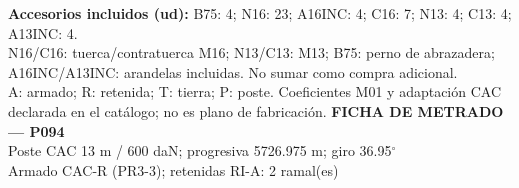 \begingroup\scriptsize
\textbf{Accesorios incluidos (ud):} B75: 4; N16: 23; A16INC: 4; C16: 7; N13: 4; C13: 4; A13INC: 4.\\
N16/C16: tuerca/contratuerca M16; N13/C13: M13; B75: perno de abrazadera; A16INC/A13INC: arandelas incluidas. No sumar como compra adicional.\\
A: armado; R: retenida; T: tierra; P: poste. Coeficientes M01 y adaptación CAC declarada en el catálogo; no es plano de fabricación.
\endgroup\endgroup
\clearpage{}
\begingroup\small\setlength{\parskip}{3pt}\renewcommand{\arraystretch}{1.05}
\textbf{\large FICHA DE METRADO — P094}\\[4pt]
Poste CAC 13 m / 600 daN; progresiva 5726.975 m; giro 36.95\ensuremath{^\circ}\\
Armado CAC-R (PR3-3); retenidas RI-A: 2 ramal(es)\\
\begingroup\scriptsize
